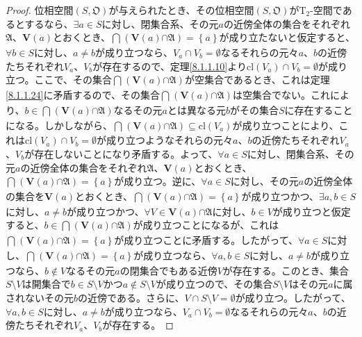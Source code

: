 \documentclass[dvipdfmx]{jsarticle}
\begin{document}
\begin{proof}
位相空間$\left( S,\mathfrak{O} \right)$が与えられたとき、その位相空間$\left( S,\mathfrak{O} \right)$が$\mathrm{T}_{2}$-空間であるとするなら、$\exists a \in S$に対し、閉集合系、その元$a$の近傍全体の集合をそれぞれ$\mathfrak{A}$、$\mathbf{V}(a)$とおくとき、$\bigcap_{} \left( \mathbf{V}(a)\mathfrak{\cap A} \right) = \left\{ a \right\}$が成り立たないと仮定すると、$\forall b \in S$に対し、$a \neq b$が成り立つなら、$V_{a} \cap V_{b} = \emptyset$なるそれらの元々$a$、$b$の近傍たちそれぞれ$V_{a}$、$V_{b}$が存在するので、定理\ref{8.1.1.10}より${\mathrm{cl}}\left( V_{a} \right) \cap V_{b} = \emptyset$が成り立つ。ここで、その集合$\bigcap_{} \left( \mathbf{V}(a)\mathfrak{\cap A} \right)$が空集合であるとき、これは定理\ref{8.1.1.24}に矛盾するので、その集合$\bigcap_{} \left( \mathbf{V}(a)\mathfrak{\cap A} \right)$は空集合でない。これにより、$b \in \bigcap_{} \left( \mathbf{V}(a)\mathfrak{\cap A} \right)$なるその元$a$とは異なる元$b$がその集合$S$に存在することになる。しかしながら、$\bigcap_{} \left( \mathbf{V}(a)\mathfrak{\cap A} \right) \subseteq {\mathrm{cl}}\left( V_{a} \right)$が成り立つことにより、これは${\mathrm{cl}}\left( V_{a} \right) \cap V_{b} = \emptyset$が成り立つようなそれらの元々$a$、$b$の近傍たちそれぞれ$V_{a}$、$V_{b}$が存在しないことになり矛盾する。よって、$\forall a \in S$に対し、閉集合系、その元$a$の近傍全体の集合をそれぞれ$\mathfrak{A}$、$\mathbf{V}(a)$とおくとき、$\bigcap_{} \left( \mathbf{V}(a)\mathfrak{\cap A} \right) = \left\{ a \right\}$が成り立つ。逆に、$\forall a \in S$に対し、その元$a$の近傍全体の集合を$\mathbf{V}(a)$とおくとき、$\bigcap_{} \left( \mathbf{V}(a)\mathfrak{\cap A} \right) = \left\{ a \right\}$が成り立つかつ、$\exists a,b \in S$に対し、$a \neq b$が成り立つかつ、$\forall V \in \mathbf{V}(a)\mathfrak{\cap A}$に対し、$b \in V$が成り立つと仮定すると、$b \in \bigcap_{} \left( \mathbf{V}(a)\mathfrak{\cap A} \right)$が成り立つことになるが、これは$\bigcap_{} \left( \mathbf{V}(a)\mathfrak{\cap A} \right) = \left\{ a \right\}$が成り立つことに矛盾する。したがって、$\forall a \in S$に対し、$\bigcap_{} \left( \mathbf{V}(a)\mathfrak{\cap A} \right) = \left\{ a \right\}$が成り立つなら、$\forall a,b \in S$に対し、$a \neq b$が成り立つなら、$b \notin V$なるその元$a$の閉集合でもある近傍$V$が存在する。このとき、集合$S \setminus V$は開集合で$b \in S \setminus V$かつ$a \notin S \setminus V$が成り立つので、その集合$S \setminus V$はその元$a$に属されないその元$b$の近傍である。さらに、$V \cap S \setminus V = \emptyset$が成り立つ。したがって、$\forall a,b \in S$に対し、$a \neq b$が成り立つなら、$V_{a} \cap V_{b} = \emptyset$なるそれらの元々$a$、$b$の近傍たちそれぞれ$V_{a}$、$V_{b}$が存在する。
\end{proof}
\end{document}
